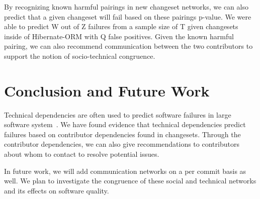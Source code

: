 \documentclass[conference]{IEEEtran}
\begin{document}
By recognizing known harmful pairings in new changeset networks, we can also predict that a
given changeset will fail based on these pairings p-value. We were able to predict 
W out of Z failures from a sample size of T  given changesets inside of Hibernate-ORM 
with Q false positives. Given 
the known harmful pairing, we can also recommend communication between the two 
contributors to support the notion of socio-technical congruence.


\section{Conclusion and Future Work}
Technical dependencies are often used to predict software failures
in large software system~\cite{Pinzger:2008:DNP, Zimmermann:2008:PDU}. 
We have found evidence that technical dependencies predict failures based on contributor
dependencies found in changesets. Through the contributor dependencies,
we can also give recommendations to contributors about whom to contact to
resolve potential issues.

In future work, we will add communication networks on a per commit basis as well. We plan
to investigate the congruence of these social and technical networks and its effects on 
software quality.







\end{document}
